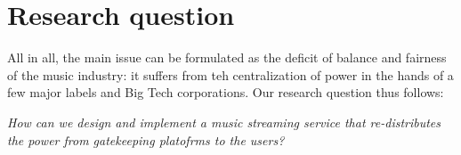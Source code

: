 \section{Research question}
All in all, the main issue can be formulated as the deficit of balance and fairness of the music industry: it suffers from teh centralization of power in the hands of a few major labels and Big Tech corporations. Our research question thus follows:

\textit{How can we design and implement a music streaming service that re-distributes the power from gatekeeping platofrms to the users?}
